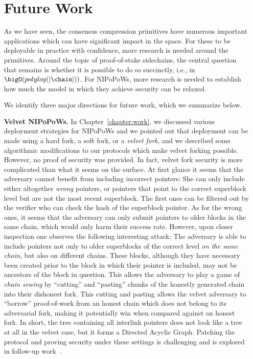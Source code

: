 \section{Future Work}

As we have seen, the consensus compression primitives have numerous important
applications which can have significant impact in the space. For these to be
deployable in practice with confidence, more research is needed around the
primitives. Around the topic of proof-of-stake sidechains, the central question
that remains is whether it is possible to do so succinctly, i.e., in
$\bigO(polylog(|\chain|))$. For NIPoPoWs, more research is needed to establish
how much the model in which they achieve security can be relaxed.

We identify three major directions for future work, which we summarize below.

\textbf{Velvet NIPoPoWs.} In Chapter~\ref{chapter:work}, we discussed various
deployment strategies for NIPoPoWs and we pointed out that deployment can be
made using a hard fork, a soft fork, or a \emph{velvet fork}, and we described
some algorithmic modifications to our protocols which make velvet forking
possible. However, no proof of security was provided. In fact, velvet fork
security is more complicated than what it seems on the surface. At first
glance it seems that the adversary cannot benefit from including incorrect
pointers: She can only include either altogether \emph{wrong} pointers, or
pointers that point to the correct superblock level but are not the most recent
superblock. The first ones can be filtered out by the verifier who can check the
hash of the superblock pointer. As for the wrong ones, it seems that the
adversary can only submit pointers to older blocks in the same chain, which
would only harm their success rate. However, upon closer inspection one observes
the following interesting attack: The adversary is able to include pointers not
only to older superblocks of the correct level \emph{on the same chain}, but
also on different chains. These blocks, although they have necessary been
created prior to the block in which their pointer is included, may not be
ancestors of the block in question. This allows the adversary to play a game of
\emph{chain sewing} by ``cutting'' and ``pasting'' chunks of the honestly
generated chain into their dishonest fork. This cutting and pasting allows the
velvet adversary to ``borrow'' proof-of-work from an honest chain which does not
belong to its adversarial fork, making it potentially win when compared against
an honest fork. In short, the tree containing all interlink pointers does not
look like a tree at all in the velvet case, but it forms a Directed Acyclic
Graph. Patching the protocol and proving security under these settings is
challenging and is explored in follow-up work~\cite{velvet-nipopows}.

